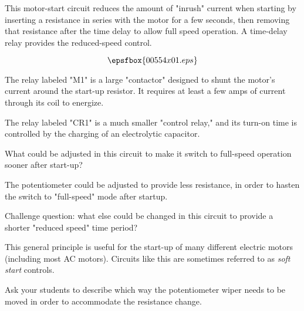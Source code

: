 

This motor-start circuit reduces the amount of "inrush" current when starting by inserting a resistance in series with the motor for a few seconds, then removing that resistance after the time delay to allow full speed operation.  A time-delay relay provides the reduced-speed control.

$$\epsfbox{00554x01.eps}$$

The relay labeled "M1" is a large "contactor" designed to shunt the motor's current around the start-up resistor.  It requires at least a few amps of current through its coil to energize.

The relay labeled "CR1" is a much smaller "control relay," and its turn-on time is controlled by the charging of an electrolytic capacitor.

What could be adjusted in this circuit to make it switch to full-speed operation sooner after start-up?







The potentiometer could be adjusted to provide less resistance, in order to hasten the switch to "full-speed" mode after startup.

\vskip 10pt

Challenge question: what else could be changed in this circuit to provide a shorter "reduced speed" time period?







This general principle is useful for the start-up of many different electric motors (including most AC motors).  Circuits like this are sometimes referred to as {\it soft start} controls.

Ask your students to describe which way the potentiometer wiper needs to be moved in order to accommodate the resistance change.




